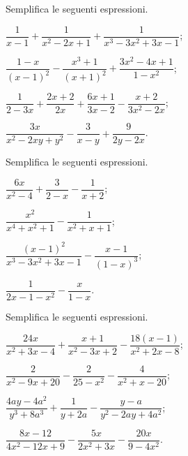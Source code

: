 \begin{esercizio}[\Ast]
Semplifica le seguenti espressioni.
\begin{multicols}{2}
\begin{enumeratea}
 \item $\dfrac{1}{x-1}+\dfrac{1}{x^{2}-2x+1}+\dfrac{1}{x^{3}-3x^{2}+3x-1}$;
 \item $\dfrac{1-x}{(x-1)^{2}}-\dfrac{x^{3}+1}{(x+1)^{2}}+\dfrac{3x^{2}-4x+1}{1-x^{2}}$;
 \item $\dfrac{1}{2-3x}+\dfrac{2x+2}{2x}+\dfrac{6x+1}{3x-2}-\dfrac{x+2}{3x^{2}-2x}$;
 \item $\dfrac{3x}{x^{2}-2xy+y^{2}}-\dfrac{3}{x-y}+\dfrac{9}{2y-2x}$.
\end{enumeratea}
\end{multicols}
\end{esercizio}

\begin{esercizio}
Semplifica le seguenti espressioni.
\begin{multicols}{2}
\begin{enumeratea}
 \item $\dfrac{6x}{x^{2}-4}+\dfrac{3}{2-x}-\dfrac{1}{x+2}$;
 \item $\dfrac{x^{2}}{x^{4}+x^{2}+1}-\dfrac{1}{x^{2}+x+1}$;
 \item $\dfrac{(x-1)^{2}}{x^{3}-3x^{2}+3x-1}-\dfrac{x-1}{(1-x)^{3}}$;
 \item $\dfrac{1}{2x-1-x^{2}}-\dfrac{x}{1-x}$.
\end{enumeratea}
\end{multicols}
\end{esercizio}

\begin{esercizio}[\Ast]
Semplifica le seguenti espressioni.
\begin{multicols}{2}
\begin{enumeratea}
 \item $\dfrac{24x}{x^{2}+3x-4}+\dfrac{x+1}{x^{2}-3x+2}-\dfrac{18(x-1)}{x^{2}+2x-8}$;
 \item $\dfrac{2}{x^{2}-9x+20}-\dfrac{2}{25-x^{2}}-\dfrac{4}{x^{2}+x-20}$;
 \item $\dfrac{4ay-4a^{2}}{y^{3}+8a^{3}}+\dfrac{1}{y+2a}-\dfrac{y-a}{y^{2}-2ay+4a^{2}}$;
 \item $\dfrac{8x-12}{4x^{2}-12x+9}-\dfrac{5x}{2x^{2}+3x}-\dfrac{20x}{9-4x^{2}}$.
\end{enumeratea}
\end{multicols}
\end{esercizio}

